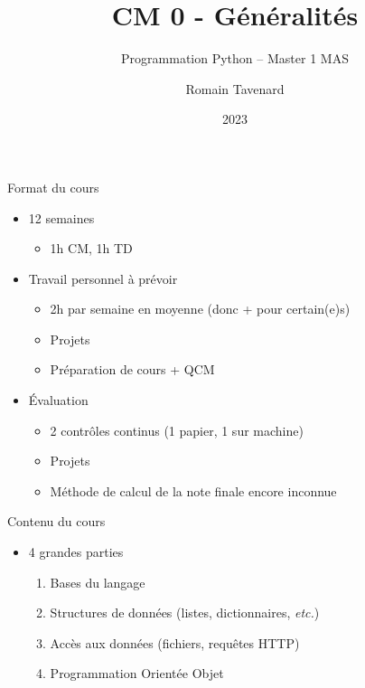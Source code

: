 \documentclass[10pt]{beamer}
\title[M1 MAS -- Python -- Généralités]{CM 0 - Généralités}
\subtitle{Programmation Python -- Master 1 MAS}
\author{Romain Tavenard}
\date{2023}
\institute{%
\hypersetup{urlcolor=.}
\makebox[2.2ex][c]{\faEnvelope}\enspace\href{mailto:romain.tavenard@univ-rennes2.fr}{\texttt{romain.tavenard@univ-rennes2.fr}}\\%
}
\begin{document}
\maketitle

\begin{frame}{Format du cours}  
  \begin{itemize}
    \item 12 semaines
    \begin{itemize}
      \item 1h CM, 1h TD
    \end{itemize}
    \item Travail personnel à prévoir
    \begin{itemize}
      \item 2h par semaine en moyenne (donc + pour certain(e)s)
      \item Projets
      \item Préparation de cours + QCM
    \end{itemize}
    \item Évaluation
    \begin{itemize}
      \item 2 contrôles continus (1 papier, 1 sur machine)
      \item Projets
      \item Méthode de calcul de la note finale encore inconnue
    \end{itemize}
  \end{itemize}
\end{frame}

\begin{frame}{Contenu du cours}  
  \begin{itemize}
    \item 4 grandes parties
    \begin{enumerate}
      \item Bases du langage
      \item Structures de données (listes, dictionnaires, \emph{etc.})
      \item Accès aux données (fichiers, requêtes HTTP)
      \item Programmation Orientée Objet
    \end{enumerate}
  \end{itemize}
\end{frame}
\end{document}
